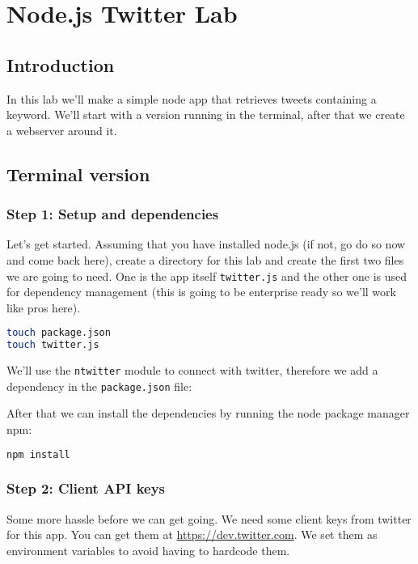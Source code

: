 \documentclass[a4paper]{report}
\begin{document}
\chapter*{\textcolor{seccol}{Node.js} Twitter Lab}

\section*{Introduction}
In this lab we'll make a simple node app that retrieves tweets containing a keyword. We'll start with a version running in the terminal, after that we create a webserver around it.

\section*{Terminal version}

\subsection*{Step 1: Setup and dependencies}
Let's get started. Assuming that you have installed node.js (if not, go do so now and come back here), create a directory for this lab and create the first two files we are going to need. One is the app itself \texttt{twitter.js} and the other one is used for dependency management (this is going to be enterprise ready so we'll work like pros here).

\begin{lstlisting}[language=bash]
touch package.json
touch twitter.js
\end{lstlisting}

\noindent We'll use the \texttt{ntwitter} module to connect with twitter, therefore we add a dependency in the \texttt{package.json} file:


After that we can install the dependencies by running the node package manager npm:
\begin{lstlisting}[language=bash]
npm install
\end{lstlisting}

\subsection*{Step 2: Client API keys}
Some more hassle before we can get going. We need some client keys from twitter for this app. You can get them at \url{https://dev.twitter.com}. We set them as environment variables to avoid having to hardcode them.
\end{document}
